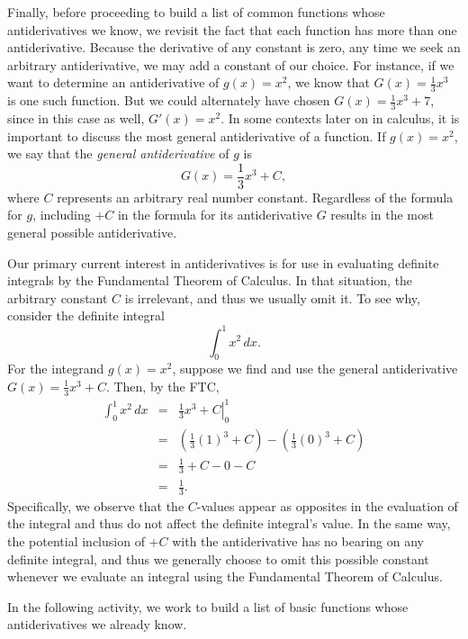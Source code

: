 Finally, before proceeding to build a list of common functions whose antiderivatives we know, we revisit the fact that each function has more than one antiderivative.  Because the derivative of any constant is zero, any time we seek an arbitrary antiderivative, we may add a constant of our choice.  For instance, if we want to determine an antiderivative of $g(x) = x^2$, we know that $G(x) = \frac{1}{3}x^3$ is one such function.  But we could alternately have chosen $G(x) = \frac{1}{3}x^3 + 7$, since in this case as well, $G'(x) = x^2$.  In some contexts later on in calculus, it is important to discuss the most general antiderivative of a function.  If $g(x) = x^2$, we say that the \emph{general antiderivative}  of $g$ is 
$$G(x) = \frac{1}{3}x^3 + C,$$
where $C$ represents an arbitrary real number constant.  Regardless of the formula for $g$, including $+C$ in the formula for its antiderivative $G$ results in the most general possible antiderivative.

Our primary current interest in antiderivatives is for use in evaluating definite integrals by the Fundamental Theorem of Calculus.  In that situation, the arbitrary constant $C$ is irrelevant, and thus we usually omit it.  To see why, consider the definite integral
$$\int_0^1 x^2 \, dx.$$
For the integrand $g(x) = x^2$, suppose we find and use the general antiderivative $G(x) = \frac{1}{3} x^3 + C.$  Then, by the FTC,
\begin{eqnarray*}
\int_0^1 x^2 \, dx & = & \left. \frac{1}{3} x^3 + C \right|_0^1 \\
			& = & \left(\frac{1}{3} (1)^3 + C  \right) - \left(\frac{1}{3} (0)^3 + C  \right) \\
			& = & \frac{1}{3} + C - 0 - C  \\
			& = & \frac{1}{3}.
\end{eqnarray*}
Specifically, we observe that the $C$-values appear as opposites in the evaluation of the integral and thus do not affect the definite integral's value.  In the same way, the potential inclusion of $+C$ with the antiderivative has no bearing on any definite integral, and thus we generally choose to omit this possible constant whenever we evaluate an integral using the Fundamental Theorem of Calculus.

In the following activity, we work to build a list of basic functions whose antiderivatives we already know.

\vfill \ 
\pagebreak 



